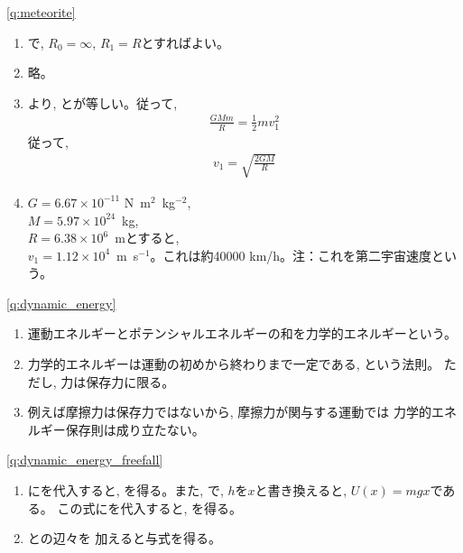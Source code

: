 \ref{q:meteorite}
\begin{enumerate}
\item {}で, $R_0=\infty$, $R_1=R$とすればよい。
\item 略。
\item {}より, とが等しい。従って, 
\begin{eqnarray}\frac{GMm}{R}=\frac{1}{2}mv_1^2\end{eqnarray}
従って, 
\begin{eqnarray}v_1=\sqrt{\frac{2GM}{R}}\end{eqnarray}
\item $G=6.67\times10^{-11}$ N~m$^2$~kg$^{-2}$, \\
$M=5.97\times10^{24}$~kg, \\
$R=6.38\times10^{6}$~mとすると, \\
$v_1=1.12\times10^4$~m~s$^{-1}$。これは約40000 km/h。注：これを第二宇宙速度という。
\end{enumerate}
\vspace{0.4cm}

%
\ref{q:dynamic_energy}
\begin{enumerate}
\item 運動エネルギーとポテンシャルエネルギーの和を力学的エネルギーという。
\item 力学的エネルギーは運動の初めから終わりまで一定である, という法則。
ただし, 力は保存力に限る。
\item 例えば摩擦力は保存力ではないから, 摩擦力が関与する運動では
力学的エネルギー保存則は成り立たない。
\end{enumerate}

\ref{q:dynamic_energy_freefall}
\begin{enumerate}
\item {}にを代入すると, 
を得る。また, で, $h$を$x$と書き換えると, $U(x)=mgx$である。
この式にを代入すると, 
を得る。
\item {}との辺々を
加えると与式を得る。
\end{enumerate}

